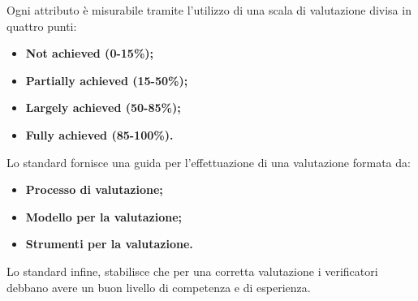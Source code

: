 	Ogni attributo è misurabile tramite l'utilizzo di una scala di valutazione divisa in quattro punti:
		\begin{itemize}
			\item \textbf{Not achieved (0-15\%);}
			\item \textbf{Partially achieved (15-50\%);}
			\item \textbf{Largely achieved (50-85\%);}
			\item \textbf{Fully achieved (85-100\%).}
		\end{itemize}
	Lo standard fornisce una guida per l'effettuazione di una valutazione formata da:
		\begin{itemize}
			\item \textbf{Processo di valutazione;}
			\item \textbf{Modello per la valutazione;}
			\item \textbf{Strumenti per la valutazione.}
		\end{itemize}
	Lo standard infine, stabilisce che per una corretta valutazione i verificatori debbano avere un buon livello di competenza e di esperienza.